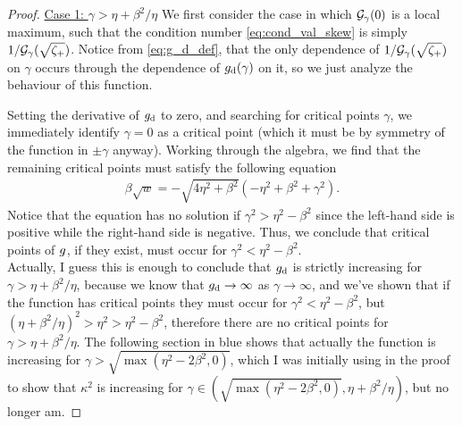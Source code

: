 \documentclass[a4paper,10pt]{article}
\begin{document}
{\begin{itemize}
\begin{proof}
\underline{Case 1: $\gamma > \eta + \beta^2/\eta$} \quad We first consider the case in which ${\cal G}_{\gamma}(0)$ is a local maximum, such that the condition number \eqref{eq:cond_val_skew} is simply $1/{\cal G}_{\gamma}(\sqrt{\zeta_+})$. Notice from \eqref{eq:g_d_def}, that the only dependence of $1/{\cal G}_{\gamma}(\sqrt{\zeta_+})$ on $\gamma$ occurs through the dependence of $g_{\rm d}(\gamma)$ on it, so we just analyze the behaviour of this function.

Setting the derivative of $g_{\rm d}$ to zero, and searching for critical points $\gamma$, we immediately identify $\gamma =  0$ as a critical point (which it must be  by symmetry of the function in $\pm \gamma$ anyway). Working through the algebra, we find that the remaining critical points must satisfy the following equation
\begin{align}
\beta \sqrt{w} = - \sqrt{4 \eta^2 + \beta^2} (-  \eta^2 + \beta^2 + \gamma^2).
\end{align}
Notice that the equation has no solution if $\gamma^2 > \eta^2 - \beta^2$ since the left-hand side is positive while the right-hand side is negative. Thus, we conclude that critical points of $g_{\rm}$, if they exist, must occur for $\gamma^2 < \eta^2 - \beta^2$. \\

Actually, I guess this is enough to conclude that $g_{\rm d}$ is strictly increasing for $\gamma > \eta + \beta^2/\eta$, because we know that $g_{\rm d} \to \infty$ as $\gamma \to \infty$, and we've shown that if the function has critical points they must occur for $\gamma^2 < \eta^2 - \beta^2$, but $(\eta + \beta^2/\eta)^2 >  \eta^2 > \eta^2 - \beta^2$, therefore there are no critical points for $\gamma > \eta + \beta^2/\eta$. The following section in blue shows that actually the function is increasing for $\gamma > \sqrt{\max(\eta^2 - 2 \beta^2,0)}$, which I was initially using in the proof to show that $\kappa^2$ is increasing for $\gamma \in (\sqrt{\max(\eta^2 - 2 \beta^2,0)}, \eta + \beta^2/\eta)$, but no longer am.


\end{proof}
\end{itemize}}
\end{document}
